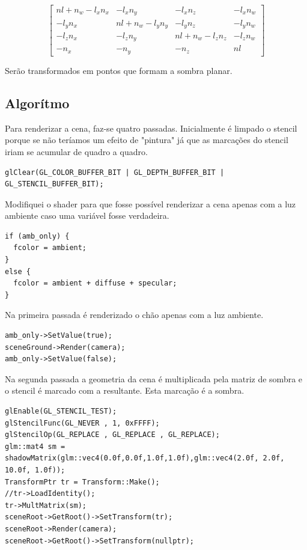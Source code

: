 \documentclass[11pt, a4paper]{article}
\begin{document}
\[
\begin{bmatrix}
  nl + n_{w} - l_{x}n_{x} & -l_{x}n_{y} & -l_{x}n_{z} & -l_{x}n_{w} \\
  -l_{y}n_{x} & nl + n_{w} - l_{y}n_{y} & -l_{y}n_{z} & -l_{y}n_{w} \\
  -l_{z}n_{x} & -l_{z}n_{y} & nl + n_{w} - l_{z}n_{z} & -l_{z}n_{w} \\
  -n_{x} & -n_{y} & -n_{z} & nl
\end{bmatrix}
\]

Serão transformados em pontos que formam a sombra planar.

\subsection{Algorítmo}
Para renderizar a cena, faz-se quatro passadas. Inicialmente é limpado o stencil 
porque se não teríamos um efeito de "pintura" já que as marcações do stencil 
iriam se acumular de quadro a quadro.

\begin{verbatim}
glClear(GL_COLOR_BUFFER_BIT | GL_DEPTH_BUFFER_BIT | GL_STENCIL_BUFFER_BIT);
\end{verbatim}

Modifiquei o shader para que fosse possível renderizar a cena apenas com a luz 
ambiente caso uma variável fosse verdadeira.

\begin{verbatim}
if (amb_only) {
  fcolor = ambient;
}
else {
  fcolor = ambient + diffuse + specular;
}
\end{verbatim}

Na primeira passada é renderizado o chão apenas com a luz ambiente.

\begin{verbatim}
amb_only->SetValue(true);
sceneGround->Render(camera);
amb_only->SetValue(false);
\end{verbatim}


Na segunda passada a geometria da cena é multiplicada pela matriz de sombra e o 
stencil é marcado com a resultante. Esta marcação é a sombra.

\begin{verbatim}
glEnable(GL_STENCIL_TEST);
glStencilFunc(GL_NEVER , 1, 0xFFFF);
glStencilOp(GL_REPLACE , GL_REPLACE , GL_REPLACE);
glm::mat4 sm = shadowMatrix(glm::vec4(0.0f,0.0f,1.0f,1.0f),glm::vec4(2.0f, 2.0f, 
10.0f, 1.0f));
TransformPtr tr = Transform::Make();
//tr->LoadIdentity();
tr->MultMatrix(sm);
sceneRoot->GetRoot()->SetTransform(tr);
sceneRoot->Render(camera);
sceneRoot->GetRoot()->SetTransform(nullptr);
\end{verbatim}
\end{document}
